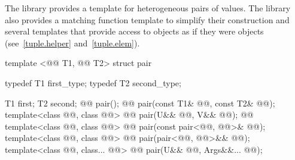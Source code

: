 \documentclass[american,twoside]{book}
\begin{document}
\pnum
The library provides a template for heterogeneous pairs of values.
The library also provides a matching function template to simplify
their construction and several templates that provide access to 
objects as if they were  objects (see~\ref{tuple.helper}
and~\ref{tuple.elem}).%
%
%
%

%
\begin{codeblock}
template <@@ T1, @@ T2>
struct pair {
  typedef T1 first_type;
  typedef T2 second_type;

  T1 first;
  T2 second;
  @@ pair();
  @@ pair(const T1& @@, const T2& @@);
  template<class @@, class @@>
    @@ 
    pair(U&& @@, V&& @@);
  @@
  template<class @@, class @@> 
    @@
    pair(const pair<@@, @@>& @@);
  template<class @@, class @@> 
    @@
    pair(pair<@@, @@>&& @@);  
  template<class @@, class... @@> 
    @@
    pair(U&& @@, Args&&... @@);
  
}
\end{codeblock}
\end{document}
